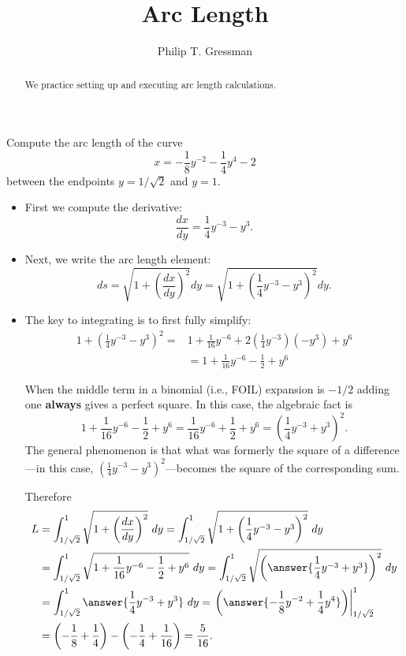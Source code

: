 \documentclass{ximera}
\title{Arc Length}
\author{Philip T. Gressman}
\begin{document}
\begin{abstract}
We practice setting up and executing arc length calculations.
\end{abstract}
\maketitle

\begin{example}%
Compute the arc length of the curve $$x = -\frac{1}{8}y^{-2} - \frac{1}{4}y^{4} - 2$$ between the endpoints $y = 1/\sqrt{2}$ and $y = 1$.
\begin{itemize}
\item First we compute the derivative: \[\frac{dx}{dy} = \frac{1}{4} y^{-3} - y^3. \]
\item Next, we write the arc length element:
\[ ds = \sqrt{ 1 + \left(\frac{dx}{dy}\right)^2} dy = \sqrt{1 + \left( \frac{1}{4} y^{-3} - y^3 \right)^2} dy. \]
\item The key to integrating is to first fully simplify:
\[ \begin{aligned}
1 + \left( \frac{1}{4} y^{-3} - y^3 \right)^2 = & 1 + \frac{1}{16} y^{-6} + 2 \left( \frac{1}{4} y^{-3} \right) \left( - y^3 \right) + y^6 \\
& = 1 + \frac{1}{16} y^{-6} - \frac{1}{2} + y^6
\end{aligned} \]
\begin{observation}
When the middle term in a binomial (i.e., FOIL) expansion is $-1/2$ adding one \textbf{always} gives a perfect square. In this case, the algebraic fact is
\[  1 + \frac{1}{16} y^{-6} - \frac{1}{2} + y^6 =   \frac{1}{16} y^{-6} + \frac{1}{2} + y^6 = \left( \frac{1}{4} y^{-3} + y^3 \right)^2. \]
The general phenomenon is that what was formerly the square of a difference---in this case, $\left( \frac{1}{4} y^{-3} - y^3 \right)^2$---becomes the square of the corresponding sum.
\end{observation} 
Therefore
$$
\begin{aligned}
L & = \int_{1/\sqrt{2}}^{1} \sqrt{1 + \left( \frac{dx}{dy} \right)^2}~dy 
   = \int_{1/\sqrt{2}}^{1} \sqrt{1 + \left( \frac{1}{4}y^{-3} - y^{3} \right)^2}~dy \\
  & = \int_{1/\sqrt{2}}^{1} \sqrt{1 + \frac{1}{16}y^{-6} - \frac{1}{2} + y^{6}} ~ dy 
   = \int_{1/\sqrt{2}}^{1} \sqrt{ \left( \answer{\frac{1}{4}y^{-3} + y^{3}} \right)^2} ~ dy \\
  & = \int_{1/\sqrt{2}}^{1} \answer{\frac{1}{4}y^{-3} + y^{3}} ~ dy 
   = \left.  \left( \answer{-\frac{1}{8}y^{-2} + \frac{1}{4}y^{4}} \right) \right|_{1/\sqrt{2}}^{1} \\
  & =  \left( -\frac{1}{8} + \frac{1}{4} \right) - \left( -\frac{1}{4} + \frac{1}{16} \right) 
   = \frac{5}{16}.
\end{aligned}
$$
\end{itemize}
\end{example}
\end{document}

